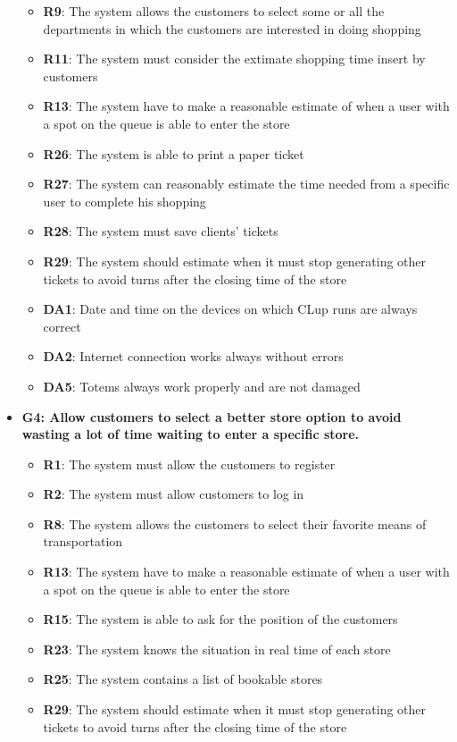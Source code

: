 \documentclass{article}
\begin{document}
\begin{itemize}
					\begin{itemize}
						
						\item {\bfseries R9}: The system allows the customers to select some or all the departments in which the customers are interested in doing shopping
						\item {\bfseries R11}: The system must consider the extimate shopping time insert by customers
						\item {\bfseries R13}: The system have to make a reasonable estimate of when a user with a spot on the queue is able to enter the store
						\item {\bfseries R26}: The system is able to print a paper ticket
						\item {\bfseries R27}: The system can reasonably estimate the time needed from a specific user to complete his shopping
						\item {\bfseries R28}: The system must save clients’ tickets
						\item {\bfseries R29}: The system should estimate when it must stop generating other tickets to	avoid turns after the closing time of the store \\
		
						\item {\bfseries DA1}: Date and time on the devices on which CLup runs are always correct
						\item {\bfseries DA2}: Internet connection works always without errors
						\item {\bfseries DA5}: Totems always work properly and are not damaged
						
					\end{itemize}

				\item {\bfseries G4: Allow customers to select a better store option to avoid wasting a lot of time waiting to enter a specific store.}	

					\begin{itemize}
						
						\item {\bfseries R1}: The system must allow the customers to register
						\item {\bfseries R2}: The system must allow customers to log in
						\item {\bfseries R8}: The system allows the customers to select their favorite means of transportation
						\item {\bfseries R13}: The system have to make a reasonable estimate of when a user with a spot on the queue is able to enter the store
						\item {\bfseries R15}: The system is able to ask for the position of the customers
						\item {\bfseries R23}: The system knows the situation in real time of each store
						\item {\bfseries R25}: The system contains a list of bookable stores
						\item {\bfseries R29}: The system should estimate when it must stop generating other tickets to	avoid turns after the closing time of the store \\
		

\end{itemize}
\end{itemize}
\end{document}
